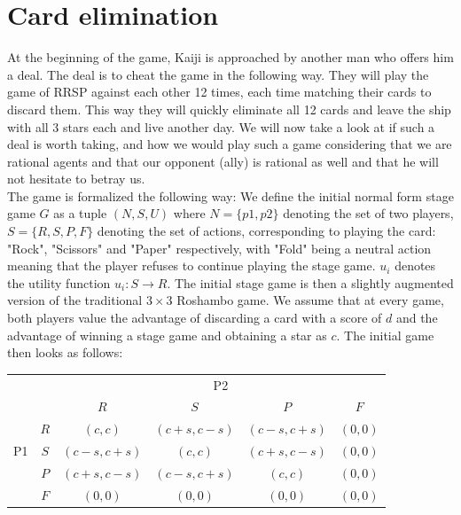 \documentclass[11pt]{article}
\begin{document}
\section{Card elimination}
At the beginning of the game, Kaiji is approached by another man who offers him a deal. The deal is to cheat the game in the following way. They will play the game of RRSP against each other 12 times, each time matching their cards to discard them. This way they will quickly eliminate all 12 cards and leave the ship with all 3 stars each and live another day. We will now take a look at if such a deal is worth taking, and how we would play such a game considering that we are rational agents and that our opponent (ally) is rational as well and that he will not hesitate to betray us. \\

\vspace{2mm}
The game is formalized the following way: We define the initial normal form stage game $G$ as a tuple $(N,S,U)$ 
where $N = \{p1, p2\}$ denoting the set of two players, $S = \{R,S,P,F\}$ denoting the set of actions, corresponding to playing the card: "Rock", "Scissors" and "Paper" respectively, with "Fold" being a neutral action meaning that the player refuses to continue playing the stage game. $u_i$ denotes the utility function $u_i : S \rightarrow R$.  The initial stage game is then a slightly augmented version of the traditional $3 \times 3$
Roshambo game. We assume that at every game, both players value the advantage of discarding a card with a score of $d$ and the advantage of winning a stage game and obtaining a star as $c$. The initial game then looks as follows:\\

\vspace{2mm}

\begin{table}[htb]
\begin{tabular}{cc|c|c|c|c|}
  & \multicolumn{1}{c}{} & \multicolumn{4}{c}{P2} \\
  & \multicolumn{1}{c}{} & \multicolumn{1}{c}{$R$}  & \multicolumn{1}{c}{$S$}  & \multicolumn{1}{c}{$P$}  & \multicolumn{1}{c}{$F$}\\\cline{3-6}
            & $R$ & $(c,c)$ & $(c + s,c - s)$ & $(c-s,c+s)$ & $(0,0)$ \\ \cline{3-6}
P1          & $S$ & $(c - s,c + s)$ & $(c,c)$ & $(c + s,c - s)$& $(0,0)$ \\\cline{3-6}
            & $P$ & $(c + s,c - s)$ & $(c - s,c + s)$ & $(c,c)$ & $(0,0)$ \\\cline{3-6}
            & $F$ & $(0,0)$ & $(0,0)$ & $(0,0)$ & $(0,0)$ \\\cline{3-6}
\end{tabular}
\end{table}
\end{document}

